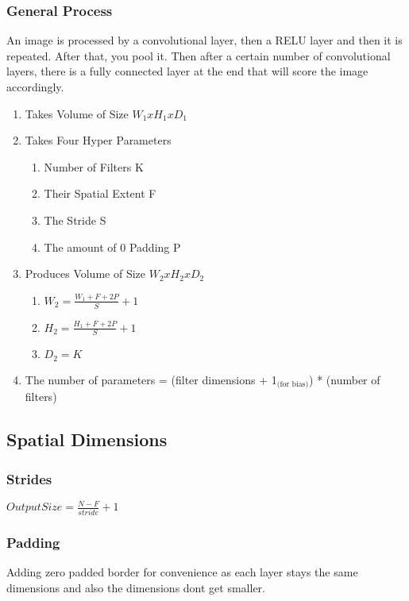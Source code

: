\documentclass[11pt]{article}
\begin{document}
\begin{enumerate}
\subsubsection{General Process}
\label{sec-3-1-1}
An image is processed by a convolutional layer, then a RELU layer and then it is repeated. After that, you pool it. Then after a certain number of convolutional layers, there is a fully connected layer at the end that will
score the image accordingly.
\begin{enumerate}
\item Takes Volume of Size $W_1 x H_1 x D_1$
\label{sec-3-1-1-1}
\item Takes Four Hyper Parameters
\label{sec-3-1-1-2}
\begin{enumerate}
\item Number of Filters K
\label{sec-3-1-1-2-1}
\item Their Spatial Extent F
\label{sec-3-1-1-2-2}
\item The Stride S
\label{sec-3-1-1-2-3}
\item The amount of 0 Padding P
\label{sec-3-1-1-2-4}
\end{enumerate}
\item Produces Volume of Size $W_2 x H_2 x D_2$
\label{sec-3-1-1-3}
\begin{enumerate}
\item $W_2 = \frac{W_1 + F + 2P}{S} + 1$
\label{sec-3-1-1-3-1}
\item $H_2 = \frac{H_1 + F + 2P}{S} + 1$
\label{sec-3-1-1-3-2}
\item $D_2 = K$
\label{sec-3-1-1-3-3}
\end{enumerate}
\item The number of parameters = (filter dimensions + 1$_{\text{(for bias)}}$) * (number of filters)
\label{sec-3-1-1-4}
\end{enumerate}
\subsection{Spatial Dimensions}
\label{sec-3-2}
\subsubsection{Strides}
\label{sec-3-2-1}
$Output Size = \frac{N-F}{stride} + 1$
\subsubsection{Padding}
\label{sec-3-2-2}
Adding zero padded border for convenience as each layer stays the same dimensions and also the dimensions dont get smaller.

\end{enumerate}
\end{document}
